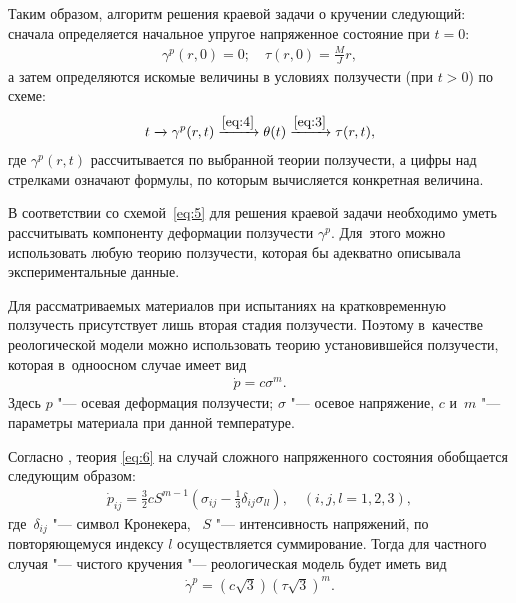 Таким образом, алгоритм решения краевой задачи о кручении следующий: 
сначала определяется начальное упругое напряженное состояние при $t=0$:
\begin{gather*}
    \gamma^p(r,0) = 0; \quad \tau(r,0) = \frac{\displaystyle M}{\displaystyle J} r,
\end{gather*}
а затем определяются искомые величины в условиях ползучести (при $t>0$) по схеме:
\begin{gather} \label{eq:5}
 t
 \xrightarrow{} \gamma^p(r,t)
 \xrightarrow{\eqref{eq:4}} \theta(t)
 \xrightarrow{\eqref{eq:3}} \tau(r,t),
\end{gather}
где $\gamma^p(r,t)$ рассчитывается по выбранной теории ползучести, а цифры над стрелками означают формулы, по которым вычисляется конкретная величина.

\smallskip

В соответствии со схемой~\eqref{eq:5} для решения краевой задачи необходимо уметь рассчитывать компоненту деформации ползучести $\gamma^p$.
Для~этого можно использовать любую теорию ползучести, которая бы адекватно описывала экспериментальные данные.

Для рассматриваемых материалов при испытаниях на кратковременную ползучесть присутствует лишь вторая стадия ползучести. Поэтому в~качестве реологической модели можно использовать теорию установившейся ползучести, которая в~одноосном случае имеет вид
\begin{gather} \label{eq:6}
	\dot{p} = c \sigma^m.
\end{gather}
Здесь $p$ "--- осевая деформация ползучести; $\sigma$ "--- осевое напряжение, $c$ и~$m$ "--- параметры материала при данной температуре.

Согласно \cite{Radchenko}, теория \eqref{eq:6} на случай сложного напряженного состояния обобщается следующим образом:
\begin{gather} \label{eq:7}
    \dot{p}_{ij} = \frac{3}{2} c S^{m - 1} \left( \sigma_{ij} - \frac{1}{3} \delta_{ij} \sigma_{ll} \right), \quad (i, j, l = 1, 2, 3),
\end{gather}
где~$\delta_{ij}$ "--- символ Кронекера, ~$S$ "--- интенсивность напряжений, по повторяющемуся индексу $l$ осуществляется суммирование.
Тогда для частного случая "--- чистого кручения "--- реологическая модель будет иметь вид
\begin{gather} \label{eq:8}
	\dot{\gamma}^p = (c\sqrt{3}) (\tau \sqrt{3})^m.
\end{gather}

